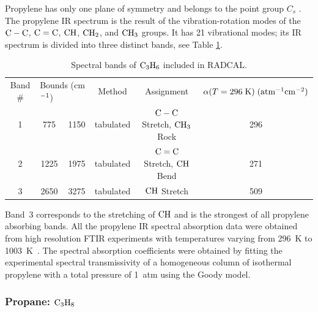 Propylene has only one plane of symmetry and belongs to the point group $C_s$ \cite{Herzberg:1949}. The propylene IR spectrum is the result of the vibration-rotation modes of the $\rm C-C$, $\rm C=C$, $\rm CH$, $\rm CH_2$, and $\rm CH_3$ groups. It has 21 vibrational modes; its IR spectrum is divided into three distinct bands, see Table \ref{Table::C3H6}.
\begin{table}[ht]
   \centering
   \caption[Spectral bands of $\rm C_3H_6$ included in RADCAL]{Spectral bands of $\rm C_3H_6$ included in RADCAL.}
   \vspace{0.1in}
   \label{Table::C3H6}
   \begin{tabular}{|c|c|c|c|c|c|}
    \hline
    Band \# & \multicolumn{2}{|l|}{Bounds (cm$\rm ^{-1}$) } & Method & Assignment & $\alpha(T=296 \; {\rm K}) \; (\rm {atm^{-1} cm^{-2}})$\\
    \cline{1-6}
    1 & 775  & 1150 & tabulated &  $\rm C-C$ Stretch, $\rm CH_3$ Rock & 296 \\
    2 & 1225 & 1975 & tabulated &  $\rm C=C$ Stretch, $\rm CH$ Bend   & 271 \\
    3 & 2650 & 3275 & tabulated &  $\rm CH$ Stretch                   & 509 \\
    \hline
   \end{tabular}
\end{table}
Band~3 corresponds to the stretching of $\rm CH$ and is the strongest of all propylene absorbing bands. All the propylene IR spectral absorption data were obtained from high resolution FTIR experiments with temperatures varying from 296~K to 1003~K~\cite{Wakatsuki:2005}. The spectral absorption coefficients were obtained by fitting the experimental spectral transmissivity of a homogeneous column of isothermal propylene with a total pressure of 1~atm using the Goody model.

\subsubsection{Propane: $\rm C_3H_8$}

